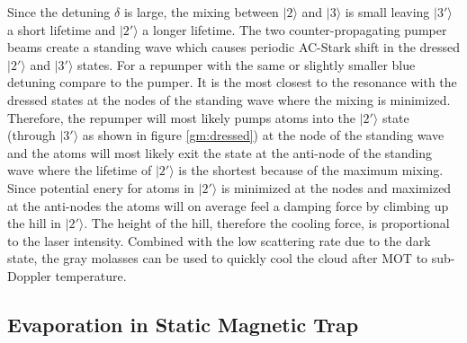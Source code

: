 Since the detuning $\delta$ is large, the mixing between $|2\rangle$ and $|3\rangle$ is small leaving $|3'\rangle$ a short lifetime and $|2'\rangle$ a longer lifetime. The two counter-propagating pumper beams create a standing wave which causes periodic AC-Stark shift in the dressed $|2'\rangle$ and $|3'\rangle$ states. For a repumper with the same or slightly smaller blue detuning compare to the pumper. It is the most closest to the resonance with the dressed states at the nodes of the standing wave where the mixing is minimized. Therefore, the repumper will most likely pumps atoms into the $|2'\rangle$ state (through $|3'\rangle$ as shown in figure \ref{gm:dressed}) at the node of the standing wave and the atoms will most likely exit the state at the anti-node of the standing wave where the lifetime of $|2'\rangle$ is the shortest because of the maximum mixing. Since potential enery for atoms in $|2'\rangle$ is minimized at the nodes and maximized at the anti-nodes the atoms will on average feel a damping force by climbing up the hill in $|2'\rangle$. The height of the hill, therefore the cooling force, is proportional to the laser intensity. Combined with the low scattering rate due to the dark state, the gray molasses can be used to quickly cool the cloud after MOT to sub-Doppler temperature.

\subsection{Evaporation in Static Magnetic Trap}\label{theory:mt}

